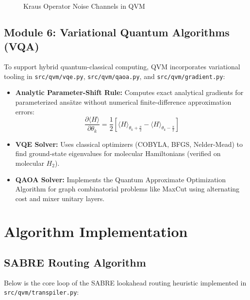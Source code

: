 \begin{figure}[!htb]
{%
}
\caption{Kraus Operator Noise Channels in QVM}
\label{fig:kraus_noise}
\end{figure}

\subsection{Module 6: Variational Quantum Algorithms (VQA)}
To support hybrid quantum-classical computing, QVM incorporates variational tooling in \texttt{src/qvm/vqe.py}, \texttt{src/qvm/qaoa.py}, and \texttt{src/qvm/gradient.py}:
\begin{itemize}[leftmargin=*]
    \item \textbf{Analytic Parameter-Shift Rule:} Computes exact analytical gradients for parameterized ansätze without numerical finite-difference approximation errors:
    \begin{equation}
    \frac{\partial \langle H \rangle}{\partial \theta_k} = \frac{1}{2} \left[ \langle H \rangle_{\theta_k + \frac{\pi}{2}} - \langle H \rangle_{\theta_k - \frac{\pi}{2}} \right]
    \end{equation}
    \item \textbf{VQE Solver:} Uses classical optimizers (COBYLA, BFGS, Nelder-Mead) to find ground-state eigenvalues for molecular Hamiltonians (verified on molecular $H_2$).
    \item \textbf{QAOA Solver:} Implements the Quantum Approximate Optimization Algorithm for graph combinatorial problems like MaxCut using alternating cost and mixer unitary layers.
\end{itemize}

\section{Algorithm Implementation}

\subsection{SABRE Routing Algorithm}
Below is the core loop of the SABRE lookahead routing heuristic implemented in \texttt{src/qvm/transpiler.py}:

